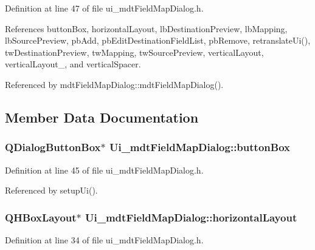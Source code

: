 Definition at line 47 of file ui\-\_\-mdt\-Field\-Map\-Dialog.\-h.



References button\-Box, horizontal\-Layout, lb\-Destination\-Preview, lb\-Mapping, lb\-Source\-Preview, pb\-Add, pb\-Edit\-Destination\-Field\-List, pb\-Remove, retranslate\-Ui(), tw\-Destination\-Preview, tw\-Mapping, tw\-Source\-Preview, vertical\-Layout, vertical\-Layout\-\_, and vertical\-Spacer.



Referenced by mdt\-Field\-Map\-Dialog\-::mdt\-Field\-Map\-Dialog().



\subsection{Member Data Documentation}
\hypertarget{class_ui__mdt_field_map_dialog_a2ff1c455b47f9ffaea9aea9261cf97ab}{
\subsubsection[{button\-Box}]{\setlength{\rightskip}{0pt plus 5cm}Q\-Dialog\-Button\-Box$\ast$ Ui\-\_\-mdt\-Field\-Map\-Dialog\-::button\-Box}}\label{class_ui__mdt_field_map_dialog_a2ff1c455b47f9ffaea9aea9261cf97ab}


Definition at line 45 of file ui\-\_\-mdt\-Field\-Map\-Dialog.\-h.



Referenced by setup\-Ui().

\hypertarget{class_ui__mdt_field_map_dialog_a833e4295c9d781adce6def558096f53d}{
\subsubsection[{horizontal\-Layout}]{\setlength{\rightskip}{0pt plus 5cm}Q\-H\-Box\-Layout$\ast$ Ui\-\_\-mdt\-Field\-Map\-Dialog\-::horizontal\-Layout}}\label{class_ui__mdt_field_map_dialog_a833e4295c9d781adce6def558096f53d}


Definition at line 34 of file ui\-\_\-mdt\-Field\-Map\-Dialog.\-h.




